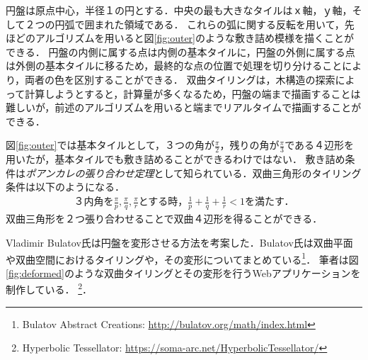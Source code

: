 円盤は原点中心，半径１の円とする．中央の最も大きなタイルはｘ軸，ｙ軸，そして２つの円弧で囲まれた領域である．
これらの弧に関する反転を用いて，先ほどのアルゴリズムを用いると図\ref{fig:outer}のような敷き詰め模様を描くことができる．
円盤の内側に属する点は内側の基本タイルに，円盤の外側に属する点は外側の基本タイルに移るため，最終的な点の位置で処理を切り分けることにより，両者の色を区別することができる．
双曲タイリングは，木構造の探索によって計算しようとすると，計算量が多くなるため，円盤の端まで描画することは難しいが，前述のアルゴリズムを用いると端までリアルタイムで描画することができる．

図\ref{fig:outer}では基本タイルとして，３つの角が$\frac{\pi}{2}$，残りの角が$\frac{\pi}{3}$である４辺形を用いたが，基本タイルでも敷き詰めることができるわけではない．
敷き詰め条件は\emph{ポアンカレの張り合わせ定理}として知られている．双曲三角形のタイリング条件は以下のようになる．
\begin{eqnarray*}
\text{３内角を}\frac{\pi}{p},\frac{\pi}{q},\frac{\pi}{r}\text{とする時，}
 \frac{1}{p} + \frac{1}{q} + \frac{1}{r} < 1 \text{を満たす．}
\end{eqnarray*}
双曲三角形を２つ張り合わせることで双曲４辺形を得ることができる．

Vladimir Bulatov氏は円盤を変形させる方法を考案した\cite{bending}．Bulatov氏は双曲平面や双曲空間におけるタイリングや，その変形についてまとめている\footnote{Bulatov Abstract Creations: \url{http://bulatov.org/math/index.html}}．
筆者は図\ref{fig:deformed}のような双曲タイリングとその変形を行うWebアプリケーションを制作している．
\footnote{Hyperbolic Tessellator: \url{https://soma-arc.net/HyperbolicTessellator/}}．


